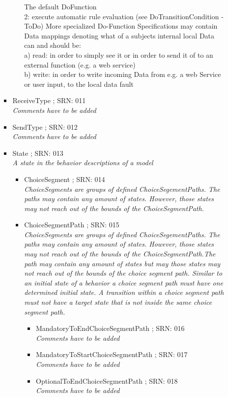 \begin{itemize}
\begin{itemize}
\begin{itemize}
\begin{itemize}
{					The default DoFunction \\2: execute automatic rule evaluation (see DoTransitionCondition - ToDo)
					More specialized Do-Function Specifications may contain Data mappings denoting what of a subjects internal local Data can and should be:\\
					a) read: in order to simply see it or in order to send it of to an external function (e.g. a web service)\\
					b) write: in order to write incoming Data from e.g. a web Service or user input, to the local data fault}
			\end{itemize}
			\item ReceiveType ; SRN: 011 \\ \textit{Comments have to be added}
			\item SendType ; SRN: 012 \\ \textit{Comments have to be added}
			\item State ; SRN: 013 \\ \textit{A state in the behavior descriptions of a model}
			\begin{itemize}
				\item ChoiceSegment ; SRN: 014 \\ \textit{ChoiceSegments are groups of defined ChoiceSegementPaths. The paths may contain any amount of states. However, those states may not reach out of the bounds of the ChoiceSegmentPath.}
				\item ChoiceSegmentPath ; SRN: 015 \\ \textit{ChoiceSegments are groups of defined ChoiceSegementPaths. The paths may contain any amount of states. However, those states may not reach out of the bounds of the ChoiceSegmentPath.The path may contain any amount of states but may those states may not reach out of the bounds of the choice segment path. Similar to an initial state of a behavior a choice segment path must have one determined initial state. A transition within a choice segment path must not have a target state that is not inside the same choice segment path.}
				\begin{itemize}
					\item MandatoryToEndChoiceSegmentPath ; SRN: 016 \\ \textit{Comments have to be added}
					\item MandatoryToStartChoiceSegmentPath ; SRN: 017 \\ \textit{Comments have to be added}
					\item OptionalToEndChoiceSegmentPath ; SRN: 018 \\ \textit{Comments have to be added}

\end{itemize}
\end{itemize}
\end{itemize}
\end{itemize}
\end{itemize}
